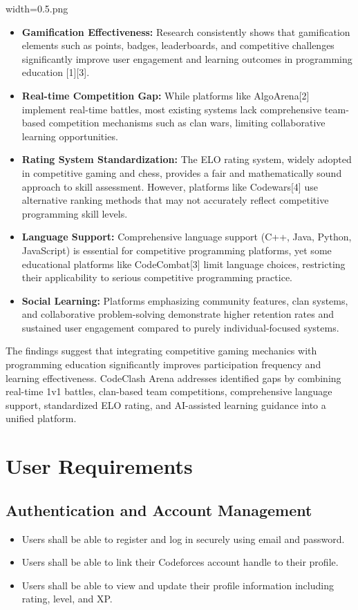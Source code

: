 width=0.5\linewidthimage.png\documentclass[12pt,a4paper]{article}
\begin{document}
\begin{itemize}
\item \textbf{Gamification Effectiveness:} Research consistently shows that gamification elements such as points, badges, leaderboards, and competitive challenges significantly improve user engagement and learning outcomes in programming education [1][3].

\item \textbf{Real-time Competition Gap:} While platforms like AlgoArena[2] implement real-time battles, most existing systems lack comprehensive team-based competition mechanisms such as clan wars, limiting collaborative learning opportunities.

\item \textbf{Rating System Standardization:} The ELO rating system, widely adopted in competitive gaming and chess, provides a fair and mathematically sound approach to skill assessment. However, platforms like Codewars[4] use alternative ranking methods that may not accurately reflect competitive programming skill levels.

\item \textbf{Language Support:} Comprehensive language support (C++, Java, Python, JavaScript) is essential for competitive programming platforms, yet some educational platforms like CodeCombat[3] limit language choices, restricting their applicability to serious competitive programming practice.

\item \textbf{Social Learning:} Platforms emphasizing community features, clan systems, and collaborative problem-solving demonstrate higher retention rates and sustained user engagement compared to purely individual-focused systems.
\end{itemize}

The findings suggest that integrating competitive gaming mechanics with programming education significantly improves participation frequency and learning effectiveness. CodeClash Arena addresses identified gaps by combining real-time 1v1 battles, clan-based team competitions, comprehensive language support, standardized ELO rating, and AI-assisted learning guidance into a unified platform.

\section{User Requirements}

\subsection{Authentication and Account Management}
\begin{itemize}
\item Users shall be able to register and log in securely using email and password.
\item Users shall be able to link their Codeforces account handle to their profile.
\item Users shall be able to view and update their profile information including rating, level, and XP.
\end{itemize}
\end{document}
